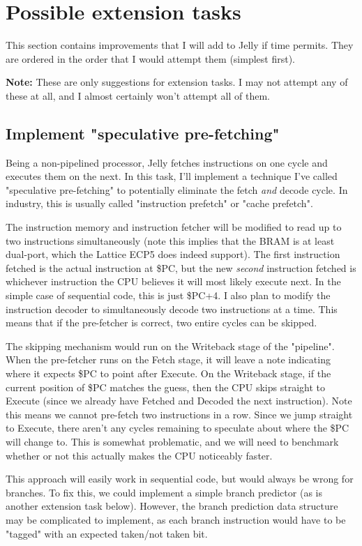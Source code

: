 \documentclass{article}
\begin{document}
\section{Possible extension tasks}
This section contains improvements that I will add to Jelly if time permits. They are ordered in the order
that I would attempt them (simplest first).

\textbf{Note:} These are only suggestions for extension tasks. I may not attempt any of these at all, and I
almost certainly won't attempt all of them.

\subsection{Implement "speculative pre-fetching"}
Being a non-pipelined processor, Jelly fetches instructions on one cycle and executes them on the next. In
this task, I'll implement a technique I've called "speculative pre-fetching" to potentially eliminate the
fetch \textit{and} decode cycle. In industry, this is usually called "instruction prefetch" or "cache
prefetch".

The instruction memory and instruction fetcher will be modified to read up to two instructions simultaneously
(note this implies that the BRAM is at least dual-port, which the Lattice ECP5 does indeed support). The
first instruction fetched is the actual instruction at \$PC, but the new \textit{second} instruction fetched
is whichever instruction the CPU believes it will most likely execute next. In the simple case of sequential
code, this is just \$PC+4. I also plan to modify the instruction decoder to simultaneously decode two
instructions at a time. This means that if the pre-fetcher is correct, two entire cycles can be skipped.

The skipping mechanism would run on the Writeback stage of the "pipeline". When the pre-fetcher runs on the
Fetch stage, it will leave a note indicating where it expects \$PC to point after Execute. On the Writeback
stage, if the current position of \$PC matches the guess, then the CPU skips straight to Execute (since we
already have Fetched and Decoded the next instruction). Note this means we cannot pre-fetch two instructions
in a row. Since we jump straight to Execute, there aren't any cycles remaining to speculate about where the
\$PC will change to. This is somewhat problematic, and we will need to benchmark whether or not this actually
makes the CPU noticeably faster.

This approach will easily work in sequential code, but would always be wrong for branches. To fix this, we
could implement a simple branch predictor (as is another extension task below). However, the branch
prediction data structure may be complicated to implement, as each branch instruction would have to be
"tagged" with an expected taken/not taken bit.
\end{document}
